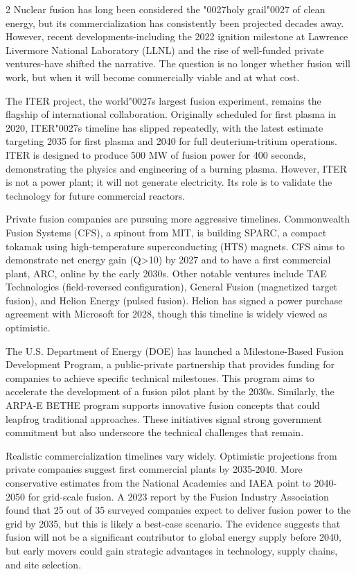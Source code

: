 \documentclass[10pt,a4paper]{article}
\newcommand{\BOApos}{{\BOQuoteFont\char"0027}}
\begin{document}
\begin{multicols}{2}
{\small Nuclear fusion has long been considered the \BOApos{}holy grail\BOApos{} of clean energy, but its commercialization has consistently been projected decades away. However, recent developments-including the 2022 ignition milestone at Lawrence Livermore National Laboratory (LLNL) and the rise of well-funded private ventures-have shifted the narrative. The question is no longer whether fusion will work, but when it will become commercially viable and at what cost.}\par
{\small The ITER project, the world\BOApos{}s largest fusion experiment, remains the flagship of international collaboration. Originally scheduled for first plasma in 2020, ITER\BOApos{}s timeline has slipped repeatedly, with the latest estimate targeting 2035 for first plasma and 2040 for full deuterium-tritium operations. ITER is designed to produce 500 MW of fusion power for 400 seconds, demonstrating the physics and engineering of a burning plasma. However, ITER is not a power plant; it will not generate electricity. Its role is to validate the technology for future commercial reactors.}\par
{\small Private fusion companies are pursuing more aggressive timelines. Commonwealth Fusion Systems (CFS), a spinout from MIT, is building SPARC, a compact tokamak using high-temperature superconducting (HTS) magnets. CFS aims to demonstrate net energy gain (Q>10) by 2027 and to have a first commercial plant, ARC, online by the early 2030s. Other notable ventures include TAE Technologies (field-reversed configuration), General Fusion (magnetized target fusion), and Helion Energy (pulsed fusion). Helion has signed a power purchase agreement with Microsoft for 2028, though this timeline is widely viewed as optimistic.}\par
{\small The U.S. Department of Energy (DOE) has launched a Milestone-Based Fusion Development Program, a public-private partnership that provides funding for companies to achieve specific technical milestones. This program aims to accelerate the development of a fusion pilot plant by the 2030s. Similarly, the ARPA-E BETHE program supports innovative fusion concepts that could leapfrog traditional approaches. These initiatives signal strong government commitment but also underscore the technical challenges that remain.}\par
{\small Realistic commercialization timelines vary widely. Optimistic projections from private companies suggest first commercial plants by 2035-2040. More conservative estimates from the National Academies and IAEA point to 2040-2050 for grid-scale fusion. A 2023 report by the Fusion Industry Association found that 25 out of 35 surveyed companies expect to deliver fusion power to the grid by 2035, but this is likely a best-case scenario. The evidence suggests that fusion will not be a significant contributor to global energy supply before 2040, but early movers could gain strategic advantages in technology, supply chains, and site selection.}\par

\end{multicols}
\end{document}
